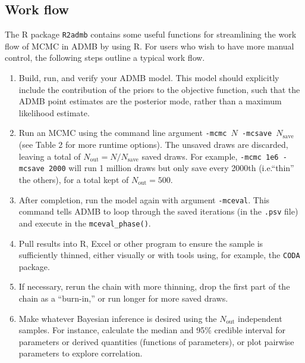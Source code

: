 \documentclass{article}\usepackage[]{graphicx}\usepackage[]{color}
\begin{document}
\subsection{Work flow}
The R package \texttt{R2admb} contains some useful functions
for streamlining the work flow of MCMC in ADMB by using
R. For users who wish to have more manual control, the
following steps outline a typical work flow.
\begin{enumerate}
\item Build, run, and verify your ADMB model. This model should
  explicitly include the contribution of the priors to the
  objective function, such that the ADMB point estimates are the
  posterior mode, rather than a maximum likelihood estimate.
\item Run an MCMC using the command line argument
  \texttt{-mcmc $N$ -mcsave $N_{\text{save}}$} (see Table 2
  for more runtime options). The unsaved draws are
  discarded, leaving a total of
  $N_{\text{out}}=N/N_{\text{save}}$ saved draws. For
  example, \texttt{-mcmc 1e6 -mcsave 2000} will run 1
  million draws but only save every 2000th (i.e.``thin'' the
  others), for a total kept of $N_{\text{out}}=500$.
\item After completion, run the model again with argument
  \texttt{-mceval}. This command tells ADMB to loop through
  the saved iterations (in the \texttt{.psv} file) and
  execute in the \texttt{mceval\_phase()}.
\item Pull results into R, Excel or other program to ensure the
  sample is sufficiently thinned, either visually or with
  tools using, for example, the \texttt{CODA} package.
\item If necessary, rerun the chain with more thinning, drop
  the first part of the chain as a ``burn-in,'' or run
  longer for more saved draws.
\item Make whatever Bayesian inference is desired using the
  $N_{\text{out}}$ independent samples. For instance,
  calculate the median and 95\% credible interval for
  parameters or derived quantities (functions of
  parameters), or plot pairwise parameters to explore
  correlation.
\end{enumerate}
\end{document}
